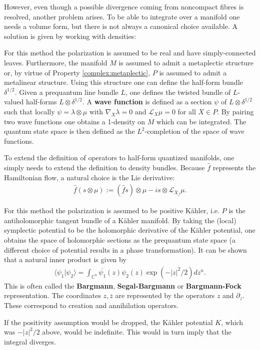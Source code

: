     However, even though a possible divergence coming from noncompact fibres is resolved, another problem arises. To be able to integrate over a manifold one needs a volume form, but there is not always a canonical choice available. A solution is given by working with densities:
    \begin{method}
        For this method the polarization is assumed to be real and have simply-connected leaves. Furthermore, the manifold $M$ is assumed to admit a metaplectic structure or, by virtue of Property \ref{complex:metaplectic}, $P$ is assumed to admit a metalinear structure. Using this structure one can define the half-form bundle $\delta^{1/2}$. Given a prequantum line bundle $L$, one defines the twisted bundle of $L$-valued half-forms $L\otimes\delta^{1/2}$. A \textbf{wave function} is defined as a section $\psi$ of $L\otimes\delta^{1/2}$ such that locally $\psi=\lambda\otimes\mu$ with $\nabla_X\lambda=0$ and $\mathcal{L}_X\mu=0$ for all $X\in P$. By pairing two wave functions one obtains a 1-density on $M$ which can be integrated. The quantum state space is then defined as the $L^2$-completion of the space of wave functions.

        To extend the definition of operators to half-form quantized manifolds, one simply needs to extend the definition to density bundles. Because $\hat{f}$ represents the Hamiltonian flow, a natural choice is the Lie derivative:
        \begin{gather}
            \hat{f}(s\otimes\mu) := (\hat{f}s)\otimes\mu - is\otimes\mathcal{L}_{X_f}\mu.
        \end{gather}
    \end{method}

    \begin{example}
        For this method the polarization is assumed to be positive K\"ahler, i.e. $P$ is the antiholomorphic tangent bundle of a K\"ahler manifold. By taking the (local) symplectic potential to be the holomorphic derivative of the K\"ahler potential, one obtains the space of holomorphic sections as the prequantum state space (a different choice of potential results in a phase transformation). It can be shown that a natural inner product is given by
        \begin{gather}
            \langle\psi_1|\psi_2\rangle = \int_{\mathbb{C}^n}\overline{\psi_1}(z)\psi_2(z)\exp(-|z|^2/2)dz^n.
        \end{gather}
        This is often called the \textbf{Bargmann}, \textbf{Segal-Bargmann} or \textbf{Bargmann-Fock} representation. The coordinates $z,\overline{z}$ are represented by the operators $z$ and $\partial_z$. These correspond to creation and annihilation operators.
    \end{example}
    \begin{remark}
        If the positivity assumption would be dropped, the K\"ahler potential $K$, which was $-|z|^2/2$ above, would be indefinite. This would in turn imply that the integral diverges.
    \end{remark}

